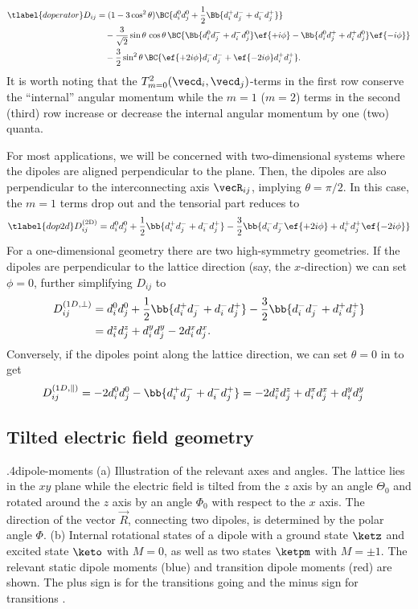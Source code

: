 \begin{align}\tlabel{doperator}
    D_{ij} &= (1-3\cos^2 \theta) \BC{ d_i^0 d_j^0 + \frac{1}{2}\Bb{d_i^+ d_j^- + d_i^- d_j^+} } \\
           &\quad -\frac{3}{\sqrt{2}}\sin\theta \,\cos\theta\, \BC{ \Bb{ d_i^0 d_j^- + d_i^- d_j^0 } \ef{+i\phi} - \Bb{ d_i^0 d_j^+ + d_i^+ d_j^0 } \ef{-i\phi} } \\
           &\quad -\frac{3}{2}\sin^2\theta \, \BC{ \ef{+2i\phi} d_i^- d_j^- + \ef{-2i\phi} d_i^+ d_j^+ }.
\end{align}
It is worth noting that the $T^2_{m=0}(\vecd_i, \vecd_j)$-terms in the first row conserve the ``internal'' angular momentum while the $m=1$ ($m=2$) terms in the second (third) row increase or decrease the internal angular momentum by one (two) quanta.

For most applications, we will be concerned with two-dimensional systems where the dipoles are aligned perpendicular to the plane. Then, the dipoles are also perpendicular to the interconnecting axis $\vecR_{ij}$, implying $\theta = \pi/2$. In this case, the $m=1$ terms drop out and the tensorial part reduces to
\begin{align} \tlabel{dop2d}
    D^\text{(2D)}_{ij} = d_i^0 d_j^0 + \frac{1}{2}\bb{d_i^+ d_j^- + d_i^- d_j^+} -\frac{3}{2} \bb{ d_i^- d_j^- \ef{+2i\phi} + d_i^+ d_j^+ \ef{-2i\phi} }
\end{align}
For a one-dimensional geometry there are two high-symmetry geometries. If the dipoles are perpendicular to the lattice direction (say, the $x$-direction) we can set $\phi=0$, further simplifying $D_{ij}$ to
\begin{align}
    D_{ij}^{(1D,\perp)} &= d_i^0 d_j^0 + \frac{1}{2}\bb{d_i^+ d_j^- + d_i^- d_j^+} -\frac{3}{2} \bb{d_i^- d_j^- + d_i^+ d_j^+} \\
 &= d_i^z d_j^z + d_i^y d_j^y - 2 d_i^x d_j^x.
\end{align}
Conversely, if the dipoles point along the lattice direction, we can set $\theta=0$ in  to get
\begin{align}
    D^{(1D,\parallel)}_{ij} &= -2 d_i^0 d_j^0 - \bb{d_i^+ d_j^- + d_i^- d_j^+} = -2 d_i^z d_j^z+ d_i^x d_j^x + d_i^y d_j^y
\end{align}

\subsection{Tilted electric field geometry}
{.4}{dipole-moments}{ }{}
{(a) Illustration of the relevant axes and angles. The lattice lies in the $xy$ plane while the electric field is tilted from the $z$ axis by an angle $\Theta_0$ and rotated around the $z$ axis by an angle $\Phi_0$ with respect to the $x$ axis. The direction of the vector $\vec{R}$, connecting two dipoles, is determined by the polar angle $\Phi$.
(b) Internal rotational states of a dipole with a ground state $\ketz$ and excited state $\keto$ with $M=0$, as well as two states $\ketpm$ with $M=\pm 1$. The relevant static dipole moments (blue) and transition dipole moments (red) are shown. The plus sign is for the transitions going  and the minus sign for transitions .}


